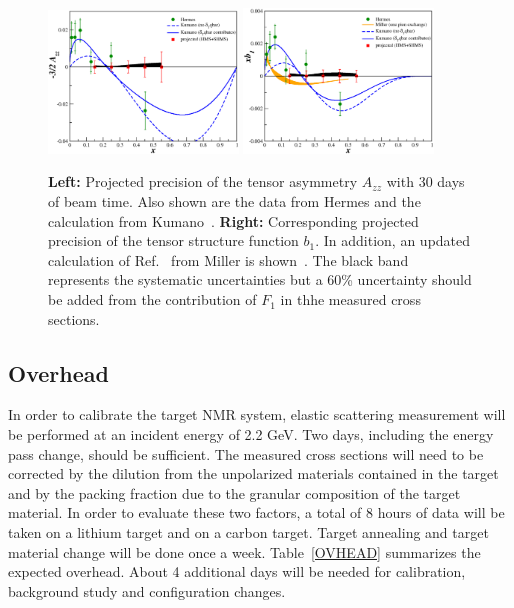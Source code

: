 \begin{figure}
\begin{center}
\includegraphics[width=0.45\textwidth]{figs/hallc/Azz_proj_lin.eps}
\hspace{0.5cm}
\includegraphics[width=0.45\textwidth]{figs/hallc/xb1_proj_newmiller_lin.eps}
\caption{\label{PROJ}
{\bf Left: }
Projected precision of the tensor asymmetry $A_{zz}$ with 30 days of beam time. Also 
shown are the data from Hermes\cite{Airapetian:2005cb} and the calculation from Kumano~\cite{Kumano:2010vz}.
{\bf Right:} Corresponding projected precision of the tensor structure function $b_1$. In addition,
an updated calculation of Ref.~\cite{Miller:1989nc} from Miller is shown~\cite{Miller_tmp}. The black band
represents the systematic uncertainties but a 60\% uncertainty should be added from the contribution
of $F_1$ in thhe measured cross sections.}
\end{center}
\end{figure}
%
\subsection{Overhead}
%
In order to calibrate the target NMR system, elastic scattering measurement will be performed at an 
incident energy of 2.2 GeV. Two days, including the energy pass change, should be sufficient. The 
measured cross sections will need to be corrected by the dilution from the unpolarized materials
contained in the target and by the packing fraction due to the granular composition of the target 
material. In order to evaluate these two factors, a total of 8 hours of data will be taken on a 
lithium target and on a carbon target. Target annealing and target material change will be done once 
a week. Table~\ref{OVHEAD} summarizes the expected overhead. About 4 additional days will be needed 
for calibration, background study and configuration changes.


